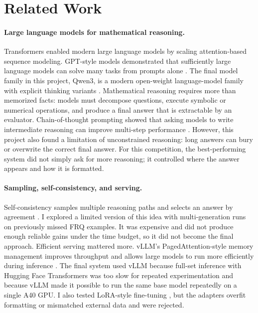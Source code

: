 \documentclass{article}
\begin{document}
\section{Related Work}
\label{sec:relatedwork}

\paragraph{Large language models for mathematical reasoning.}
Transformers \citep{vaswani2017attention} enabled modern large language models by scaling attention-based sequence modeling. GPT-style models demonstrated that sufficiently large language models can solve many tasks from prompts alone \citep{brown2020language}. The final model family in this project, Qwen3, is a modern open-weight language-model family with explicit thinking variants \citep{yang2025qwen3,qwen2025modelcard}. Mathematical reasoning requires more than memorized facts: models must decompose questions, execute symbolic or numerical operations, and produce a final answer that is extractable by an evaluator. Chain-of-thought prompting showed that asking models to write intermediate reasoning can improve multi-step performance \citep{wei2022cot}. However, this project also found a limitation of unconstrained reasoning: long answers can bury or overwrite the correct final answer. For this competition, the best-performing system did not simply ask for more reasoning; it controlled where the answer appears and how it is formatted.

\paragraph{Sampling, self-consistency, and serving.}
Self-consistency samples multiple reasoning paths and selects an answer by agreement \citep{wang2023selfconsistency}. I explored a limited version of this idea with multi-generation runs on previously missed FRQ examples. It was expensive and did not produce enough reliable gains under the time budget, so it did not become the final approach. Efficient serving mattered more. vLLM's PagedAttention-style memory management improves throughput and allows large models to run more efficiently during inference \citep{kwon2023vllm}. The final system used vLLM because full-set inference with Hugging Face Transformers was too slow for repeated experimentation and because vLLM made it possible to run the same base model repeatedly on a single A40 GPU. I also tested LoRA-style fine-tuning \citep{hu2022lora}, but the adapters overfit formatting or mismatched external data and were rejected.
\end{document}
